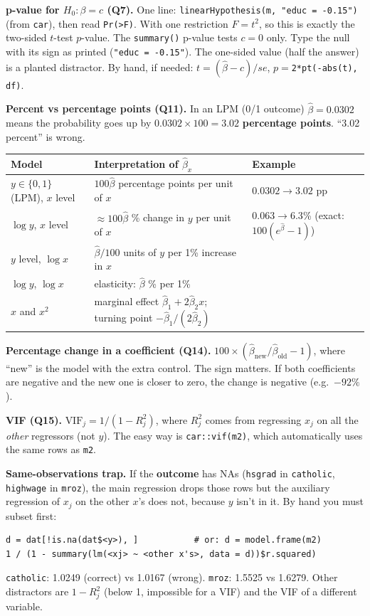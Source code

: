 \documentclass[10pt]{article}
\newcommand{\code}[1]{\texttt{#1}}
\begin{document}
\textbf{p-value for $H_0:\beta=c$ (Q7).} One line: \code{linearHypothesis(m, "educ = -0.15")} (from \code{car}), then read \code{Pr(>F)}. With one restriction $F=t^2$, so this is exactly the two-sided $t$-test $p$-value. The \code{summary()} p-value tests $c=0$ only. Type the null with its sign as printed (\code{"educ = -0.15"}). The one-sided value (half the answer) is a planted distractor. By hand, if needed: $t=(\hat\beta-c)/se$, $p=$\code{2*pt(-abs(t), df)}.

\textbf{Percent vs percentage points (Q11).} In an LPM (0/1 outcome) $\hat\beta=0.0302$ means the probability goes up by $0.0302 \times 100 = 3.02$ \textbf{percentage points}. ``3.02 percent'' is wrong.
\begin{center}\small
\begin{tabular}{@{}lll@{}}\toprule
Model & Interpretation of $\hat\beta_x$ & Example\\ \midrule
$y\in\{0,1\}$ (LPM), $x$ level & $100\hat\beta$ percentage points per unit of $x$ & $0.0302\to3.02$ pp\\
$\log y$, $x$ level & $\approx 100\hat\beta$ \% change in $y$ per unit of $x$ & $0.063\to6.3$\% (exact: $100(e^{\hat\beta}-1)$)\\
$y$ level, $\log x$ & $\hat\beta/100$ units of $y$ per 1\% increase in $x$ & \\
$\log y$, $\log x$ & elasticity: $\hat\beta$ \% per 1\% & \\
$x$ and $x^2$ & marginal effect $\hat\beta_1 + 2\hat\beta_2 x$; turning point $-\hat\beta_1/(2\hat\beta_2)$ & \\ \bottomrule
\end{tabular}
\end{center}

\textbf{Percentage change in a coefficient (Q14).} $100\times(\hat\beta_{\text{new}}/\hat\beta_{\text{old}} - 1)$, where ``new'' is the model with the extra control. The sign matters. If both coefficients are negative and the new one is closer to zero, the change is negative (e.g.\ $-92\%$).

\textbf{VIF (Q15).} $\text{VIF}_j = 1/(1-R_j^2)$, where $R_j^2$ comes from regressing $x_j$ on all the \textit{other} regressors (not $y$). The easy way is \code{car::vif(m2)}, which automatically uses the same rows as \code{m2}.
\begin{trap}
\textbf{Same-observations trap.} If the \textbf{outcome} has NAs (\code{hsgrad} in \code{catholic}, \code{highwage} in \code{mroz}), the main regression drops those rows but the auxiliary regression of $x_j$ on the other $x$'s does not, because $y$ isn't in it. By hand you must subset first:
\begin{lstlisting}
d = dat[!is.na(dat$<y>), ]           # or: d = model.frame(m2)
1 / (1 - summary(lm(<xj> ~ <other x's>, data = d))$r.squared)
\end{lstlisting}
\code{catholic}: 1.0249 (correct) vs 1.0167 (wrong). \code{mroz}: 1.5525 vs 1.6279. Other distractors are $1-R_j^2$ (below 1, impossible for a VIF) and the VIF of a different variable.
\end{trap}
\end{document}
